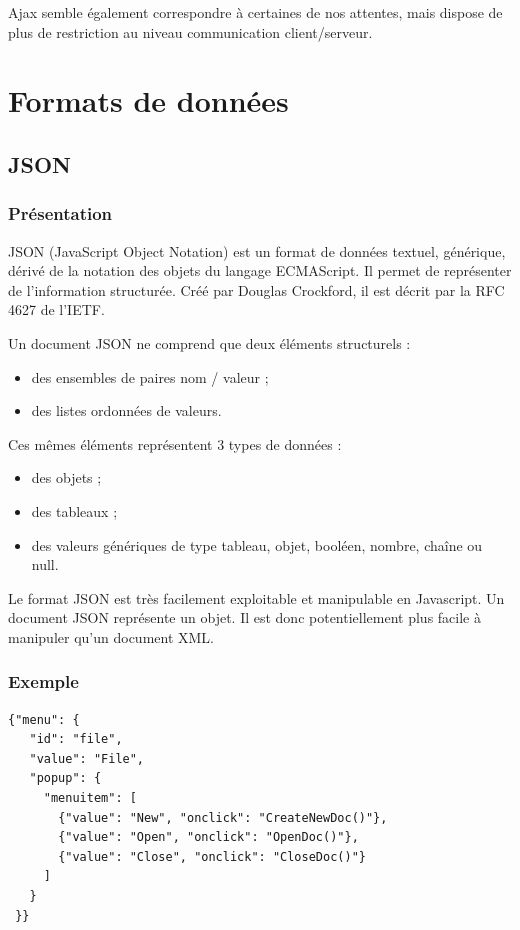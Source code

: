 \documentclass[a4paper,10pt]{report}
\begin{document}
Ajax semble également correspondre à certaines de nos attentes, mais dispose de plus
de restriction au niveau communication client/serveur.

\chapter{Formats de données}

  \section{JSON}

    \subsection{Présentation}

JSON (JavaScript Object Notation) est un format de données textuel, 
générique, dérivé de la notation des objets du langage ECMAScript. 
Il permet de représenter de l’information structurée. Créé par Douglas 
Crockford, il est décrit par la RFC 4627 de l’IETF.


Un document JSON ne comprend que deux éléments structurels : 
\begin{itemize}
 \item des ensembles de paires nom / valeur ; 
 \item des listes ordonnées de valeurs. 
\end{itemize}


Ces mêmes éléments représentent 3 types de données : 
\begin{itemize}
  \item des objets ; 
  \item des tableaux ; 
  \item des valeurs génériques de type tableau, objet, booléen, nombre, chaîne ou null. 
\end{itemize}

Le format JSON est très facilement exploitable et manipulable en Javascript. 
Un document JSON représente un objet. Il est donc potentiellement plus facile 
à manipuler qu'un document XML.

    \subsection{Exemple}

\begin{verbatim}
{"menu": {
   "id": "file",
   "value": "File",
   "popup": {
     "menuitem": [
       {"value": "New", "onclick": "CreateNewDoc()"},
       {"value": "Open", "onclick": "OpenDoc()"},
       {"value": "Close", "onclick": "CloseDoc()"}
     ]
   }
 }}
\end{verbatim}
\end{document}
